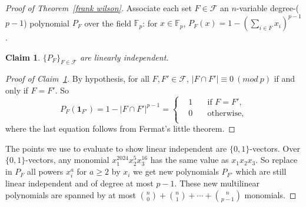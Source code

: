 \documentclass{article}
\newtheorem{claim}[theorem]{Claim}
\theoremstyle{definition}
\begin{document}
\begin{proof}[Proof of Theorem~\ref{frank wilson}]
    Associate each set $F\in \mathcal{F}$ an $n$-variable degree-($p-1$) polynomial $P_{F}$ over the field $\mathbb{F}_{p}$: for $x\in \mathbb{F}_{p}$, $P_{F}(x)=1-(\sum_{i\in F}x_{i})^{p-1}$.
    
    \begin{claim}\label{linear independent}
        $\{ P_{F} \}_{F\in \mathcal{F}}$ are linearly independent.
    \end{claim}

    \begin{proof}[Proof of Claim~\ref{linear independent}]
        By hypothesis, for all $F, F' \in \mathcal{F}$, $|F\cap F'|\equiv 0\ (mod\ p)$ if and only if $F=F'$. So
        $$P_{F}(\mathbf{1}_{F'})=1-|F\cap F'|^{p-1}=\left\{
    	\begin{aligned}
    	&1 \quad &\text{if }F=F',\\
    	&0 \quad &\text{otherwise},\\
    	\end{aligned}
    	\right
    	.$$
    where the last equation follows from Fermat's little theorem.
    \end{proof}
    
    The points we use to evaluate to show linear independent are $\{ 0,1 \}$-vectors. Over $\{ 0,1 \}$-vectors, any monomial $x_{1}^{2024}x_{2}^{5}x_{3}^{16}$ has the same value as $x_{1}x_{2}x_{3}$. So replace in $P_{F}$ all powers $x_{i}^{a}$ for $a\geq 2$ by $x_{i}$ we get new polynomials $P_{F'}$ which are still linear independent and of degree at most $p-1$. These new multilinear polynomials are spanned by at most $\binom{n}{0}+\binom{n}{1}+\cdots+\binom{n}{p-1}$ monomials.
\end{proof}


\newpage


\label{key}
\end{document}
